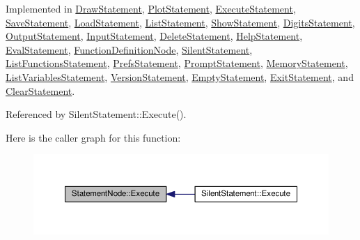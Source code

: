 Implemented in \hyperlink{classDrawStatement_af3be5149199ab9940b43ee5a2360ba80}{Draw\+Statement}, \hyperlink{classPlotStatement_a653ff64c2c918b3209be426f7c243459}{Plot\+Statement}, \hyperlink{classExecuteStatement_a8a3bbafeb8739749eab6eaf8a4b9969c}{Execute\+Statement}, \hyperlink{classSaveStatement_ae94aa8533f620634f97b2835cee1eaa2}{Save\+Statement}, \hyperlink{classLoadStatement_ae3cbd157ad8de73551ff430fa3c089d9}{Load\+Statement}, \hyperlink{classListStatement_a49cc9fe49b665a1276f288c069e1c78b}{List\+Statement}, \hyperlink{classShowStatement_a8466ad7e0e61918cda0e399713abb6a8}{Show\+Statement}, \hyperlink{classDigitsStatement_a5a16b621b4759cdc0bf980b01858350b}{Digits\+Statement}, \hyperlink{classOutputStatement_a870c0d2b4bffb94e542d1e5890ec3c20}{Output\+Statement}, \hyperlink{classInputStatement_ac4a9288ba2fe5002ae78d65c270222a5}{Input\+Statement}, \hyperlink{classDeleteStatement_a709e8696c9ca4be32679e6a72b82de86}{Delete\+Statement}, \hyperlink{classHelpStatement_a733d3471c3bcfdd2d07d4766bbdbf6db}{Help\+Statement}, \hyperlink{classEvalStatement_a6d3e0e2db3ed8cbdaa3250bf959a0be7}{Eval\+Statement}, \hyperlink{classFunctionDefinitionNode_af51888496269ad95052794a6898ccc07}{Function\+Definition\+Node}, \hyperlink{classSilentStatement_a8fdf9e3c83dafa43d092282db0bd47b4}{Silent\+Statement}, \hyperlink{classListFunctionsStatement_aecbd17235ded16103ebed33a8fcca90e}{List\+Functions\+Statement}, \hyperlink{classPrefsStatement_ac53922eb842ba389957300fef95cd98f}{Prefs\+Statement}, \hyperlink{classPromptStatement_ad315c8cc58132641e9b8a62902566318}{Prompt\+Statement}, \hyperlink{classMemoryStatement_a0cfd7aae34f2103c7734980907426f4e}{Memory\+Statement}, \hyperlink{classListVariablesStatement_a2ca734439e1c118b8b62d550baac8dc0}{List\+Variables\+Statement}, \hyperlink{classVersionStatement_a0601a810472862583ef4c702c6f1fd0a}{Version\+Statement}, \hyperlink{classEmptyStatement_a5d873e1f5f9b48abe4201319f5e687b0}{Empty\+Statement}, \hyperlink{classExitStatement_a0c7aef922938d7f7f02b8ca402a3bd38}{Exit\+Statement}, and \hyperlink{classClearStatement_ad01255515180fd5271c491386df560a8}{Clear\+Statement}.



Referenced by Silent\+Statement\+::\+Execute().



Here is the caller graph for this function\+:
\nopagebreak
\begin{figure}[H]
\begin{center}
\leavevmode
\includegraphics[width=350pt]{d1/dcd/classStatementNode_a721589622c930c010927b9a9c55b173e_icgraph}
\end{center}
\end{figure}



